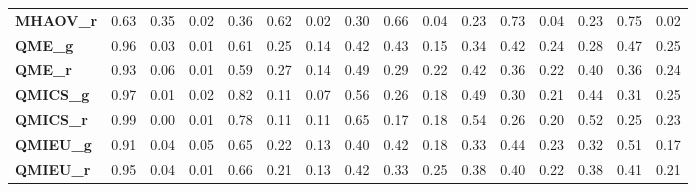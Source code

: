 \begin{anexo}
\begin{table}
{\begin{tabular}{lrrrrrrrrrrrrrrr}
\textbf{MHAOV\_r} &        0.63 &  0.35 &     0.02 &        0.36 &  0.62 &     0.02 &        0.30 &  0.66 &     0.04 &        0.23 &  0.73 &     0.04 &        0.23 &  0.75 &     0.02 \\
\textbf{QME\_g  } &        0.96 &  0.03 &     0.01 &        0.61 &  0.25 &     0.14 &        0.42 &  0.43 &     0.15 &        0.34 &  0.42 &     0.24 &        0.28 &  0.47 &     0.25 \\
\textbf{QME\_r  } &        0.93 &  0.06 &     0.01 &        0.59 &  0.27 &     0.14 &        0.49 &  0.29 &     0.22 &        0.42 &  0.36 &     0.22 &        0.40 &  0.36 &     0.24 \\
\textbf{QMICS\_g} &        0.97 &  0.01 &     0.02 &        0.82 &  0.11 &     0.07 &        0.56 &  0.26 &     0.18 &        0.49 &  0.30 &     0.21 &        0.44 &  0.31 &     0.25 \\
\textbf{QMICS\_r} &        0.99 &  0.00 &     0.01 &        0.78 &  0.11 &     0.11 &        0.65 &  0.17 &     0.18 &        0.54 &  0.26 &     0.20 &        0.52 &  0.25 &     0.23 \\
\textbf{QMIEU\_g} &        0.91 &  0.04 &     0.05 &        0.65 &  0.22 &     0.13 &        0.40 &  0.42 &     0.18 &        0.33 &  0.44 &     0.23 &        0.32 &  0.51 &     0.17 \\
\textbf{QMIEU\_r} &        0.95 &  0.04 &     0.01 &        0.66 &  0.21 &     0.13 &        0.42 &  0.33 &     0.25 &        0.38 &  0.40 &     0.22 &        0.38 &  0.41 &     0.21 \\
\bottomrule
\end{tabular}}
\end{table}    
    
    

\end{anexo}
